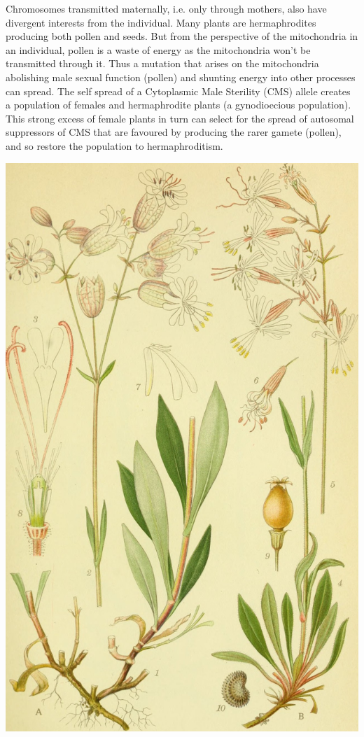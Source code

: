 {Chromosomes transmitted maternally, i.e. only through mothers, also have divergent
interests from the individual. Many plants are hermaphrodites producing
both pollen and seeds. But from the perspective of the mitochondria in
an individual, pollen is a waste of energy as the mitochondria won't
be transmitted through it. Thus a mutation that arises on the
mitochondria abolishing male sexual function (pollen) and shunting energy into
other processes can spread. 
The self spread of a Cytoplasmic Male
Sterility (CMS) allele creates a population
of females and hermaphrodite plants (a gynodioecious population).
This strong excess of female plants in
turn can select for the spread of autosomal suppressors of CMS that are
favoured by producing the rarer gamete (pollen), and so restore the
population to hermaphroditism.   \begin{marginfigure}
\begin{center}
\includegraphics[width= \textwidth]{illustration_images/single_locus_selection/Silene_vulgaris/20184393949_9e22db5ff4_k.jpg}

\end{center}
\end{marginfigure}}
